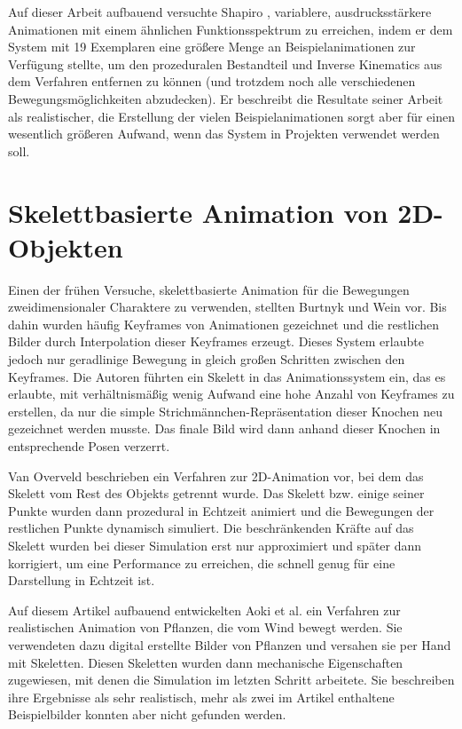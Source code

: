 Auf dieser Arbeit aufbauend versuchte Shapiro \cite{shapiro2011building}, variablere, ausdrucksstärkere Animationen mit einem ähnlichen Funktionsspektrum zu erreichen, indem er dem System mit 19 Exemplaren eine größere Menge an Beispielanimationen zur Verfügung stellte, um den prozeduralen Bestandteil und Inverse Kinematics aus dem Verfahren entfernen zu können (und trotzdem noch alle verschiedenen Bewegungsmöglichkeiten abzudecken). Er beschreibt die Resultate seiner Arbeit als realistischer, die Erstellung der vielen Beispielanimationen sorgt aber für einen wesentlich größeren Aufwand, wenn das System in Projekten verwendet werden soll.

\section{Skelettbasierte Animation von 2D-Objekten}
Einen der frühen Versuche, skelettbasierte Animation für die Bewegungen zweidimensionaler Charaktere zu verwenden, stellten Burtnyk und Wein \cite{burtnyk1976interactive} vor. Bis dahin wurden häufig Keyframes von Animationen gezeichnet und die restlichen Bilder durch Interpolation dieser Keyframes erzeugt. Dieses System erlaubte jedoch nur geradlinige Bewegung in gleich großen Schritten zwischen den Keyframes. Die Autoren führten ein Skelett in das Animationssystem ein, das es erlaubte, mit verhältnismäßig wenig Aufwand eine hohe Anzahl von Keyframes zu erstellen, da nur die simple Strichmännchen-Repräsentation dieser Knochen neu gezeichnet werden musste. Das finale Bild wird dann anhand dieser Knochen in entsprechende Posen verzerrt.

Van Overveld \cite{van1990technique} beschrieben ein Verfahren zur 2D-Animation vor, bei dem das Skelett vom Rest des Objekts getrennt wurde. Das Skelett bzw. einige seiner Punkte wurden dann prozedural in Echtzeit animiert und die Bewegungen der restlichen Punkte dynamisch simuliert. Die beschränkenden Kräfte auf das Skelett wurden bei dieser Simulation erst nur approximiert und später dann korrigiert, um eine Performance zu erreichen, die schnell genug für eine Darstellung in Echtzeit ist.

Auf diesem Artikel aufbauend entwickelten Aoki et al. \cite{aoki1999dynamic} ein Verfahren zur realistischen Animation von Pflanzen, die vom Wind bewegt werden. Sie verwendeten dazu digital erstellte Bilder von Pflanzen und versahen sie per Hand mit Skeletten. Diesen Skeletten wurden dann mechanische Eigenschaften zugewiesen, mit denen die Simulation im letzten Schritt arbeitete. Sie beschreiben ihre Ergebnisse als sehr realistisch, mehr als zwei im Artikel enthaltene Beispielbilder konnten aber nicht gefunden werden.

